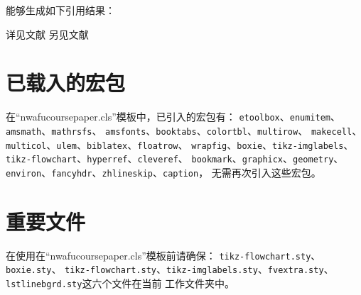 \documentclass{nwafucoursepaper}
\begin{document}
能够生成如下引用结果：

详见文献\cite{Peebles2001-100-100}\parencite{Babu2014--}
另见文献\cite[49]{于潇2012-1518-1523}\parencite[106]{Babu2014--}

\section{已载入的宏包}
在\enquote{nwafucoursepaper.cls}模板中，已引入的宏包有：
\verb|etoolbox|、\verb|enumitem|、\verb|amsmath|、\verb|mathrsfs|、
\verb|amsfonts|、\verb|booktabs|、\verb|colortbl|、\verb|multirow|、
\verb|makecell|、\verb|multicol|、\verb|ulem|、\verb|biblatex|、\verb|floatrow|、
\verb|wrapfig|、\verb|boxie|、\verb|tikz-imglabels|、
\verb|tikz-flowchart|、\verb|hyperref|、\verb|cleveref|、
\verb|bookmark|、\verb|graphicx|、\verb|geometry|、
\verb|environ|、\verb|fancyhdr|、\verb|zhlineskip|、\verb|caption|，
无需再次引入这些宏包。

\section{重要文件}
\begin{importantBox}
  在使用在\enquote{nwafucoursepaper.cls}模板前请确保：
  \verb|tikz-flowchart.sty|、\verb|boxie.sty|、
  \verb|tikz-flowchart.sty|、\verb|tikz-imglabels.sty|、\verb|fvextra.sty|、\verb|lstlinebgrd.sty|这六个文件在当前
  工作文件夹中。
\end{importantBox}

\printbibliography[heading=bibliography,title=参考文献]
\end{document}
